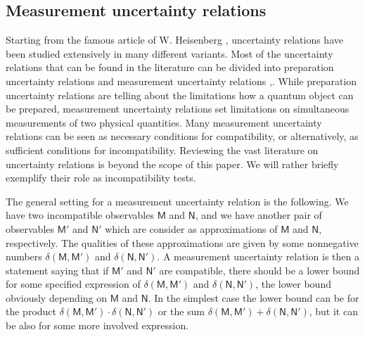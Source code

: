 \documentclass[12pt]{article}
\theoremstyle{definition}
\newcommand{\Mo}{\mathsf{M}}%
\newcommand{\No}{\mathsf{N}}%
\begin{document}
\subsection{Measurement uncertainty relations}\label{sec:ur}

Starting from the famous article of W. Heisenberg \cite{Heisenberg27}, uncertainty relations have been studied extensively in many different variants.
Most of the uncertainty relations that can be found in the literature can be divided into preparation uncertainty relations and measurement uncertainty relations \cite{BuHeLa07},\cite{Muynck00}.
While preparation uncertainty relations are telling about the limitations how a quantum object can be prepared, measurement uncertainty relations set limitations on simultaneous measurements of two physical quantities.  
Many measurement uncertainty relations can be seen as necessary conditions for compatibility, or alternatively, as sufficient conditions for incompatibility. 
Reviewing the vast literature on uncertainty relations is beyond the scope of this paper. 
We will rather briefly exemplify their role as incompatibility tests.

The general setting for a measurement uncertainty relation is the following. 
We have two incompatible observables $\Mo$ and $\No$, and we have another pair of observables $\Mo'$ and $\No'$ which are consider as approximations of $\Mo$ and $\No$, respectively.
The qualities of these approximations are given by some 
nonnegative numbers $\delta(\Mo,\Mo')$ and $\delta(\No,\No')$. 
A measurement uncertainty relation is then a statement saying that if $\Mo'$ and $\No'$ are compatible, there should be a lower bound for some specified expression of $\delta(\Mo, \Mo')$ and $\delta(\No, \No')$, the lower bound obviously depending on $\Mo$ and $\No$.
In the simplest case the lower bound can be for the product $\delta(\Mo,\Mo')\cdot\delta(\No,\No')$ or the sum $\delta(\Mo,\Mo')+\delta(\No,\No')$, but it can be also for some more involved expression. 
\end{document}
